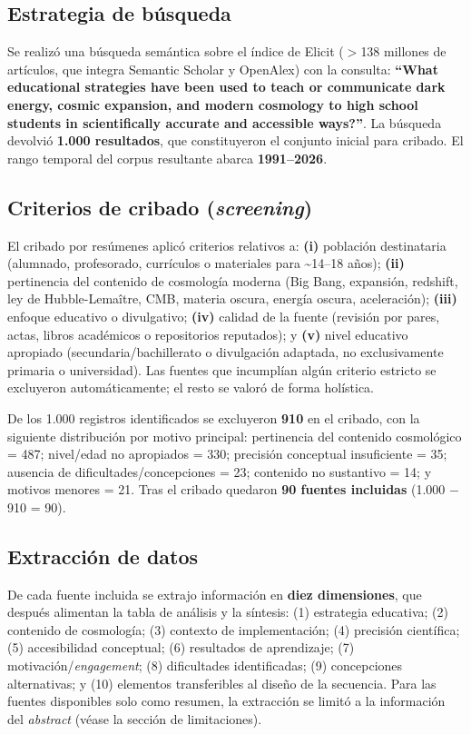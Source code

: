 \subsection{Estrategia de búsqueda}

Se realizó una búsqueda semántica sobre el índice de Elicit ($>$138 millones de artículos, que integra Semantic Scholar y OpenAlex) con la consulta: \textbf{``What educational strategies have been used to teach or communicate dark energy, cosmic expansion, and modern cosmology to high school students in scientifically accurate and accessible ways?''}. La búsqueda devolvió \textbf{1.000 resultados}, que constituyeron el conjunto inicial para cribado. El rango temporal del corpus resultante abarca \textbf{1991--2026}.

\subsection{Criterios de cribado (\textit{screening})}

El cribado por resúmenes aplicó criterios relativos a: \textbf{(i)} población destinataria (alumnado, profesorado, currículos o materiales para \textasciitilde14--18 años); \textbf{(ii)} pertinencia del contenido de cosmología moderna (Big Bang, expansión, redshift, ley de Hubble-Lemaître, CMB, materia oscura, energía oscura, aceleración); \textbf{(iii)} enfoque educativo o divulgativo; \textbf{(iv)} calidad de la fuente (revisión por pares, actas, libros académicos o repositorios reputados); y \textbf{(v)} nivel educativo apropiado (secundaria/bachillerato o divulgación adaptada, no exclusivamente primaria o universidad). Las fuentes que incumplían algún criterio estricto se excluyeron automáticamente; el resto se valoró de forma holística.

De los 1.000 registros identificados se excluyeron \textbf{910} en el cribado, con la siguiente distribución por motivo principal: pertinencia del contenido cosmológico = 487; nivel/edad no apropiados = 330; precisión conceptual insuficiente = 35; ausencia de dificultades/concepciones = 23; contenido no sustantivo = 14; y motivos menores = 21. Tras el cribado quedaron \textbf{90 fuentes incluidas} (1.000 $-$ 910 = 90).

\subsection{Extracción de datos}

De cada fuente incluida se extrajo información en \textbf{diez dimensiones}, que después alimentan la tabla de análisis y la síntesis: (1) estrategia educativa; (2) contenido de cosmología; (3) contexto de implementación; (4) precisión científica; (5) accesibilidad conceptual; (6) resultados de aprendizaje; (7) motivación/\textit{engagement}; (8) dificultades identificadas; (9) concepciones alternativas; y (10) elementos transferibles al diseño de la secuencia. Para las fuentes disponibles solo como resumen, la extracción se limitó a la información del \textit{abstract} (véase la sección de limitaciones).

